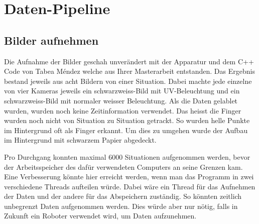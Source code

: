 \newpage
\section{Daten-Pipeline}
\label{chapter:daten_pipeline}
\subsection{Bilder aufnehmen}
\label{chapter:bilder_aufnehmen}
Die Aufnahme der Bilder geschah unverändert mit der Apparatur und dem C++ Code von Tabea Méndez welche aus Ihrer Masterarbeit \cite{TabeasFingertracking} entstanden. 
Das Ergebnis bestand jeweils aus acht Bildern von einer Situation. 
Dabei machte jede einzelne von vier Kameras jeweils ein schwarzweiss-Bild mit UV-Beleuchtung und ein schwarzweiss-Bild mit normaler weisser Beleuchtung.
Als die Daten gelablet wurden, wurden noch keine Zeitinformation verwendet.
Das heisst die Finger wurden noch nicht von Situation zu Situation getrackt.
So wurden helle Punkte im Hintergrund oft als Finger erkannt.
Um dies zu umgehen wurde der Aufbau im Hintergrund mit schwarzem Papier abgedeckt.

Pro Durchgang konnten maximal 6000 Situationen aufgenommen werden, bevor der Arbeitsspeicher des dafür verwendeten Computers an seine Grenzen kam. 
Eine Verbesserung könnte hier erreicht werden, wenn man das Programm in zwei verschiedene Threads aufteilen würde.
Dabei wäre ein Thread für das Aufnehmen der Daten und der andere für das Abspeichern zuständig.
So könnten \grqq{}zeitlich unbegrenzt\grqq{} Daten aufgenommen werden. 
Dies würde aber nur nötig, falls in Zukunft ein Roboter verwendet wird, um Daten aufzunehmen.

